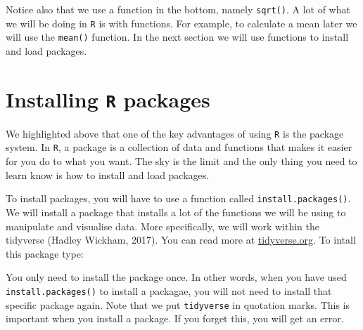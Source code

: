 \documentclass[12pt,oneside]{reedthesis}
\theoremstyle{definition}
\theoremstyle{definition}
\theoremstyle{definition}
\theoremstyle{remark}
\begin{document}
  Notice also that we use a function in the bottom, namely
  \texttt{sqrt()}. A lot of what we will be doing in \texttt{R} is with
  functions. For example, to calculate a mean later we will use the
  \texttt{mean()} function. In the next section we will use functions to
  install and load packages.
  
  \section{\texorpdfstring{Installing \texttt{R}
  packages}{Installing R packages}}\label{installing-r-packages}
  
  We highlighted above that one of the key advantages of using \texttt{R}
  is the package system. In \texttt{R}, a package is a collection of data
  and functions that makes it easier for you do to what you want. The sky
  is the limit and the only thing you need to learn know is how to install
  and load packages.
  
  To install packages, you will have to use a function called
  \texttt{install.packages()}. We will install a package that installs a
  lot of the functions we will be using to manipulate and visualise data.
  More specifically, we will work within the tidyverse (Hadley Wickham,
  2017). You can read more at \href{http://tidyverse.org/}{tidyverse.org}.
  To intall this package type:
  \begin{Shaded}
  \begin{Highlighting}[]
  \NormalTok{(}\NormalTok{)}
  \end{Highlighting}
  \end{Shaded}
  You only need to install the package once. In other words, when you have
  used \texttt{install.packages()} to install a packagae, you will not
  need to install that specific package again. Note that we put
  \texttt{tidyverse} in quotation marks. This is important when you
  install a package. If you forget this, you will get an error.
  
\end{document}
